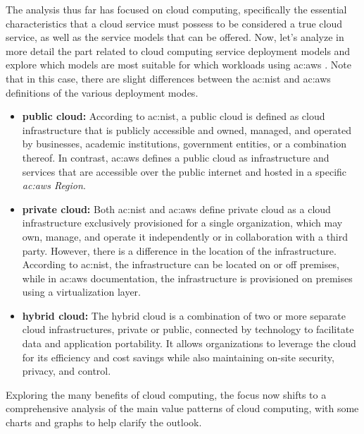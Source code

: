 The analysis thus far has focused on cloud computing, specifically the essential characteristics that a cloud service must possess to be considered a true cloud service, as well as the service models that can be offered. Now, let's analyze in more detail the part related to cloud computing service deployment models and explore which models are most suitable for which workloads using \gls{ac:aws} \cite{AWSPrivatePublicHybrid}. Note that in this case, there are slight differences between the \gls{ac:nist} and \gls{ac:aws} definitions of the various deployment modes.
\begin{itemize}
    \item \textbf{public cloud:} According to \gls{ac:nist}, a public cloud is defined as cloud infrastructure that is publicly accessible and owned, managed, and operated by businesses, academic institutions, government entities, or a combination thereof. In contrast, \gls{ac:aws} defines a public cloud as infrastructure and services that are accessible over the public internet and hosted in a specific \textit{\gls{ac:aws} Region}.
    \item \textbf{private cloud:} Both \gls{ac:nist} and \gls{ac:aws} define private cloud as a cloud infrastructure exclusively provisioned for a single organization, which may own, manage, and operate it independently or in collaboration with a third party. However, there is a difference in the location of the infrastructure. According to \gls{ac:nist}, the infrastructure can be located on or off premises, while in \gls{ac:aws} documentation, the infrastructure is provisioned on premises using a virtualization layer.
    \item \textbf{hybrid cloud:} The hybrid cloud is a combination of two or more separate cloud infrastructures, private or public, connected by technology to facilitate data and application portability. It allows organizations to leverage the cloud for its efficiency and cost savings while also maintaining on-site security, privacy, and control.
\end{itemize}

Exploring the many benefits of cloud computing, the focus now shifts to a comprehensive analysis of the main value patterns of cloud computing, with some charts and graphs to help clarify the outlook.

